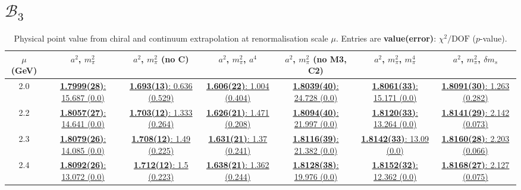\documentclass[12pt]{extarticle}
\begin{document}
\section{$\mathcal{B}_3$}
\begin{table}[h!]
\begin{center}
\begin{tabular}{|c|c|c|c|c|c|c|}
\hline
$\mu$ (GeV) & $a^2$, $m_\pi^2$& $a^2$, $m_\pi^2$ (no C)& $a^2$, $m_\pi^2$, $a^4$& $a^2$, $m_\pi^2$ (no M3, C2)& $a^2$, $m_\pi^2$, $m_\pi^4$& $a^2$, $m_\pi^2$, $\delta m_s$\\
\hline
2.0& \hyperlink{SSmPP/NPR/a2m2_20.pdf.1}{\textbf{1.7999(28)}: 15.687 (0.0)} & \hyperlink{SSmPP/NPR/a2m2noC_20.pdf.1}{\textbf{1.693(13)}: 0.636 (0.529)} & \hyperlink{SSmPP/NPR/a2a4m2_20.pdf.1}{\textbf{1.606(22)}: 1.004 (0.404)} & \hyperlink{SSmPP/NPR/a2m2mcut_20.pdf.1}{\textbf{1.8039(40)}: 24.728 (0.0)} & \hyperlink{SSmPP/NPR/a2m2m4_20.pdf.1}{\textbf{1.8061(33)}: 15.171 (0.0)} & \hyperlink{SSmPP/NPR/a2m2delm_20.pdf.1}{\textbf{1.8091(30)}: 1.263 (0.282)}\\
2.2& \hyperlink{SSmPP/NPR/a2m2_22.pdf.1}{\textbf{1.8057(27)}: 14.641 (0.0)} & \hyperlink{SSmPP/NPR/a2m2noC_22.pdf.1}{\textbf{1.703(12)}: 1.333 (0.264)} & \hyperlink{SSmPP/NPR/a2a4m2_22.pdf.1}{\textbf{1.626(21)}: 1.471 (0.208)} & \hyperlink{SSmPP/NPR/a2m2mcut_22.pdf.1}{\textbf{1.8094(40)}: 21.997 (0.0)} & \hyperlink{SSmPP/NPR/a2m2m4_22.pdf.1}{\textbf{1.8120(33)}: 13.264 (0.0)} & \hyperlink{SSmPP/NPR/a2m2delm_22.pdf.1}{\textbf{1.8141(29)}: 2.142 (0.073)}\\
2.3& \hyperlink{SSmPP/NPR/a2m2_23.pdf.1}{\textbf{1.8079(26)}: 14.085 (0.0)} & \hyperlink{SSmPP/NPR/a2m2noC_23.pdf.1}{\textbf{1.708(12)}: 1.49 (0.225)} & \hyperlink{SSmPP/NPR/a2a4m2_23.pdf.1}{\textbf{1.631(21)}: 1.37 (0.241)} & \hyperlink{SSmPP/NPR/a2m2mcut_23.pdf.1}{\textbf{1.8116(39)}: 21.382 (0.0)} & \hyperlink{SSmPP/NPR/a2m2m4_23.pdf.1}{\textbf{1.8142(33)}: 13.09 (0.0)} & \hyperlink{SSmPP/NPR/a2m2delm_23.pdf.1}{\textbf{1.8160(28)}: 2.203 (0.066)}\\
2.4& \hyperlink{SSmPP/NPR/a2m2_24.pdf.1}{\textbf{1.8092(26)}: 13.072 (0.0)} & \hyperlink{SSmPP/NPR/a2m2noC_24.pdf.1}{\textbf{1.712(12)}: 1.5 (0.223)} & \hyperlink{SSmPP/NPR/a2a4m2_24.pdf.1}{\textbf{1.638(21)}: 1.362 (0.244)} & \hyperlink{SSmPP/NPR/a2m2mcut_24.pdf.1}{\textbf{1.8128(38)}: 19.976 (0.0)} & \hyperlink{SSmPP/NPR/a2m2m4_24.pdf.1}{\textbf{1.8152(32)}: 12.362 (0.0)} & \hyperlink{SSmPP/NPR/a2m2delm_24.pdf.1}{\textbf{1.8168(27)}: 2.127 (0.075)}\\
\hline
\end{tabular}
\caption{Physical point value from chiral and continuum extrapolation at renormalisation scale $\mu$. Entries are \textbf{value(error)}: $\chi^2/\text{DOF}$ ($p$-value).}
\end{center}
\end{table}
\end{document}
